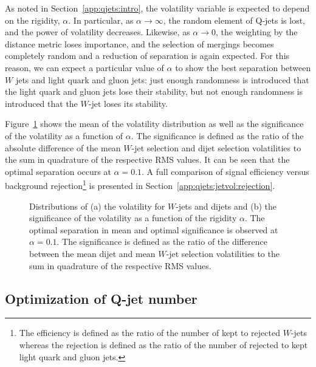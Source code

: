 As noted in Section~\ref{app:qjets:intro}, the volatility variable is expected to depend on the rigidity, $\alpha$. In particular, as $\alpha\rightarrow\infty$, the random element of Q-jets is lost, and the power of volatility decreases. Likewise, as $\alpha\rightarrow 0$, the weighting by the distance metric loses importance, and the selection of mergings becomes completely random and a reduction of separation is again expected. For this reason, we can expect a particular value of $\alpha$ to show the best separation between $W$ jets and light quark and gluon jets: just enough randomness is introduced that the light quark and gluon jets lose their stability, but not enough randomness is introduced that the $W$-jet loses its stability.

Figure~\ref{fig:Vol_vs_alpha} shows the mean of the volatility distribution as well as the significance of the volatility as a function of $\alpha$. The significance is defined as the ratio of the absolute difference of the mean $W$-jet selection and dijet selection volatilities to the sum in quadrature of the respective RMS values. It can be seen that the optimal separation occurs at $\alpha = 0.1$. A full comparison of signal efficiency versus background rejection\footnote{The efficiency is defined as the ratio of the number of kept to rejected $W$-jets whereas the rejection is defined as the ratio of the number of rejected to kept light quark and gluon jets.} is presented in Section~\ref{app:qjets:jetvol:rejection}.

\begin{figure}[htbp]
\centering
{}
\caption{Distributions of (a) the volatility for $W$-jets and dijets and (b) the significance of the volatility  as a function of the rigidity $\alpha$. The optimal separation in mean and optimal significance is observed at $\alpha = 0.1$. The significance is defined as the ratio of the difference between the mean dijet and mean $W$-jet selection volatilities to the sum in quadrature of the respective RMS values.}
\label{fig:Vol_vs_alpha}
\end{figure}

\subsection{Optimization of Q-jet number}
\label{app:qjets:jetvol:number}

